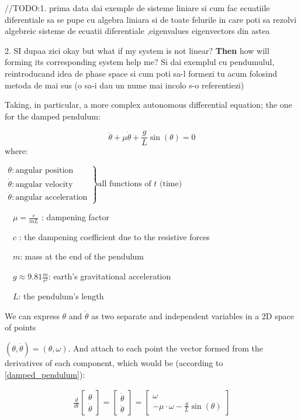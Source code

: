 //TODO:1. prima data dai exemple de sisteme liniare si cum fac ecuatiile diferentiale sa se pupe cu algebra liniara si de toate felurile in care poti sa rezolvi algebreic sisteme de ecuatii diferentiale ,eigenvalues eigenvectors din astea \par
2. SI dupaa zici okay but what if my system is not linear? \textbf{Then} how will forming its corresponding system help me? Si dai exemplul cu pendumulul, reintroducand idea de phase space si cum poti sa-l formezi tu acum folosind metoda de mai sus (o sa-i dau un nume mai incolo s-o referentiezi)


Taking, in particular, a more complex autonomous differential equation; the one for the damped pendulum:

\begin{equation}\label{damped_pendulum}
    \ddot{\theta} +\mu\dot{\theta} + \frac{g}{L}\sin(\theta) = 0
\end{equation}
where:  \par
$
    \left.
    \begin{array}{l}
        \theta : \text{angular position}       \\
        \dot{\theta} : \text{angular velocity} \\
        \ddot{\theta} : \text{angular acceleration}
    \end{array}
    \right\}
    \text{all functions of } t \text{ (time)}
$

\ \ $\mu = \frac{c}{mL}$ : dampening factor \par
\ \ $c$ : the dampening coefficient due to the resistive forces \par
\ \ $m$: mass at the end of the pendulum \par
\ \ $g \approx 9.81 \frac{m}{s^2}$: earth's gravitational acceleration \par
\ \ $L$: the pendulum's length \par

We can express $\theta$ and $\dot{\theta}$ as two separate and independent variables in a 2D space of points \par $(\theta,\dot{\theta}) = (\theta,\omega)$.
And attach to each point the vector formed from the derivatives of each component, which would be (according to \ref{damped_pendulum}):

\begin{align}
    \frac{d}{dt} \begin{bmatrix}
                     \theta \\
                     \dot{\theta}
                 \end{bmatrix} =
    \begin{bmatrix}
        \dot{\theta} \\
        \ddot{\theta}
    \end{bmatrix} =
    \begin{bmatrix}
        \omega \\
        -\mu \cdot \omega - \frac{g}{L}\sin(\theta)
    \end{bmatrix}
\end{align}

